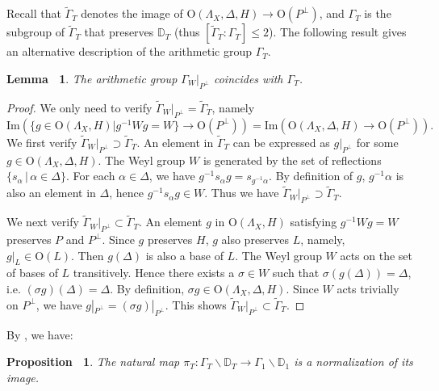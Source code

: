 \documentclass[12pt,reqno,a4paper]{amsart}
\newtheorem{lem}[thm]{Lemma~}
\newtheorem{prop}[thm]{Proposition~}
\theoremstyle{remark}
\theoremstyle{definition}
\newcommand{\DD}{\mathbb{D}}
\newcommand\Image{\mathrm{Im}}
\newcommand\Or{\mathrm{O}}
\newcommand{\bs}{\backslash}
\begin{document}
Recall that $\widetilde{\Gamma}_T$ denotes the image of $\Or(\Lambda_X,\Delta,H) \to \Or(P^\perp)$, and $\Gamma_T$ is the subgroup of $\widetilde{\Gamma}_T$ that preserves $\DD_T$ (thus $[\widetilde{\Gamma}_T:\Gamma_T]\le 2$).
The following result gives an alternative description of the arithmetic group $\Gamma_T$.
\begin{lem}
\label{lem: Gamma_W|_P^perp = Gamma_T}
    The arithmetic group $\Gamma_W|_{P^\perp}$ coincides with $\Gamma_T$.
\end{lem}
\begin{proof}
    We only need to verify $\widetilde{\Gamma}_W|_{P^\perp}=\widetilde{\Gamma}_T$, namely
    \begin{equation*}
        \Image( \{ g\in \Or(\Lambda_X,H) \big| g^{-1}Wg=W \} \to \Or(P^\perp) ) = \Image ( \Or(\Lambda_X,\Delta,H) \to \Or(P^\perp) ).
    \end{equation*}
    We first verify $\widetilde\Gamma_W|_{P^\perp} \supset \widetilde\Gamma_T$.
    An element in $\widetilde\Gamma_T$ can be expressed as $g|_{P^\perp}$ for some $g\in \Or(\Lambda_X,\Delta,H)$.
    The Weyl group $W$ is generated by the set of reflections $\{ s_\alpha \,|\, \alpha\in \Delta \}$.
    For each $\alpha\in \Delta$, we have $g^{-1} s_\alpha g = s_{g^{-1}\alpha}$.
    By definition of $g$, $g^{-1}\alpha$ is also an element in $\Delta$, hence $g^{-1} s_\alpha g \in W$.
    Thus we have $\widetilde\Gamma_W|_{P^\perp} \supset \widetilde\Gamma_T$.

    We next verify $\widetilde\Gamma_W|_{P^\perp} \subset \widetilde\Gamma_T$.
    An element $g$ in $\Or(\Lambda_X,H)$ satisfying $g^{-1}Wg=W$ preserves $P$ and $P^\perp$.
    Since $g$ preserves $H$, $g$ also preserves $L$, namely, $g|_{L}\in \Or(L)$.
    Then $g(\Delta)$ is also a base of $L$.
    The Weyl group $W$ acts on the set of bases of $L$ transitively.
    Hence there exists a $\sigma\in W$ such that $\sigma (g(\Delta)) = \Delta$, i.e. $(\sigma g) (\Delta) = \Delta$.
    By definition, $\sigma g\in \Or(\Lambda_X,\Delta,H)$. 
    Since $W$ acts trivially on $P^\perp$, we have $g|_{P^\perp} = (\sigma g)|_{P^\perp}$.
    This shows $\widetilde\Gamma_W|_{P^\perp} \subset \widetilde\Gamma_T$.
\end{proof}

By \cite[Proposition A.5]{yu2020fourfolds}, we have:
\begin{prop}
    The natural map $\pi_T\colon \Gamma_T\bs \DD_T \to \Gamma_1\bs \DD_1$ is a normalization of its image.
\end{prop}
\end{document}
